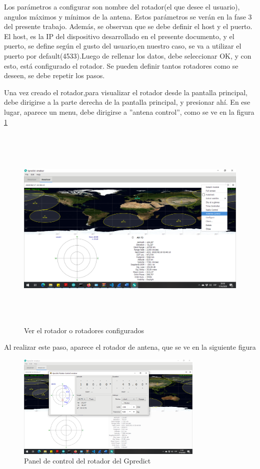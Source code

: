 Los parámetros a configurar son nombre del rotador(el que desee el usuario), angulos máximos y mínimos de la antena. Estos parámetros se verán en la fase 3 del presente trabajo. Además, se observan que se debe definir el host y el puerto. El host, es la IP del dispositivo desarrollado en el presente documento, y el puerto, se define según el gusto del usuario,en nuestro caso, se va a utilizar el puerto por default(4533).Luego de rellenar los datos, debe seleccionar OK, y con esto, está configurado el rotador. Se pueden definir tantos rotadores como se deseen, se debe repetir los pasos. 

Una vez creado el rotador,para visualizar el rotador desde la pantalla principal, debe dirigirse a la parte derecha de la pantalla principal, y presionar ahí. En ese lugar, aparece un menu, debe dirigirse a ''antena control'', como se ve en la figura \ref{fig:ant_ctrl} 
\begin{figure}[H]
	\includegraphics[height=10cm,width=\linewidth]{antena_control}
	\caption{Ver el rotador o rotadores configurados} 
	\label{fig:ant_ctrl}
\end{figure}



Al realizar este paso, aparece el rotador de antena, que se ve en la siguiente figura 

\begin{figure}[H]
	\centering 
	\includegraphics[trim=5.4cm 8cm 9.2cm 2.4cm ,clip,width=\linewidth,height=5cm]{antena_gpr_control}
	\caption{Panel de control del rotador del Gpredict} 
	\label{fig:pan_ctrl_antena}
\end{figure}

